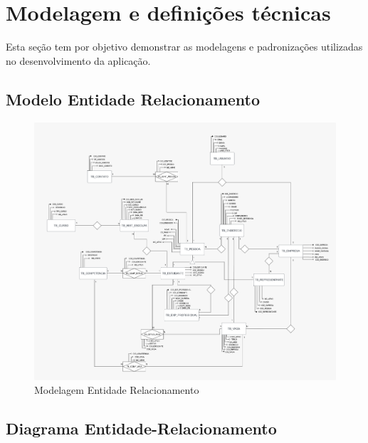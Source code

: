 \section{Modelagem e definições técnicas}
Esta seção tem por objetivo demonstrar as modelagens e padronizações utilizadas no desenvolvimento da aplicação.

\subsection{Modelo Entidade Relacionamento}

\begin{figure}[H]
	\centering 
	\caption{\label{fig:mer}Modelagem Entidade Relacionamento}
	\includegraphics[width=\textwidth]{../imagens/Mer-estagiei.png} 
\end{figure}

\subsection{Diagrama Entidade-Relacionamento}

